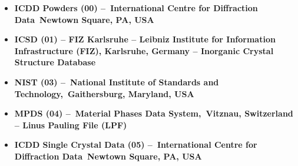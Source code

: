 



\begin{itemize}
    \item \textbf{ICDD Powders (00) – International Centre for Diffraction Data Newtown Square, PA, USA}
    \item \textbf{ICSD (01) – FIZ Karlsruhe – Leibniz Institute for Information Infrastructure (FIZ), Karlsruhe, Germany – Inorganic Crystal Structure Database}
    \item \textbf{NIST (03) – National Institute of Standards and Technology, Gaithersburg, Maryland, USA}
    \item \textbf{MPDS (04) – Material Phases Data System, Vitznau, Switzerland – Linus Pauling File (LPF)}
    \item \textbf{ICDD Single Crystal Data (05) – International Centre for Diffraction Data Newtown Square, PA, USA}
\end{itemize}
 
